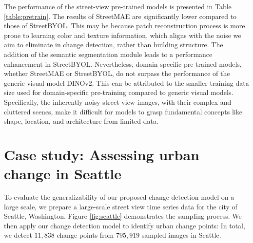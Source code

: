 \documentclass[letterpaper]{article} %
\begin{document}
The performance of the street-view pre-trained models is presented in Table \ref{table:pretrain}. The results of StreetMAE are significantly lower compared to those of StreetBYOL. This may be because patch reconstruction process is more prone to learning color and texture information, which aligns with the noise we aim to eliminate in change detection, rather than building structure. The addition of the semantic segmentation module leads to a performance enhancement in StreetBYOL. Nevertheless, domain-specific pre-trained models, whether StreetMAE or StreetBYOL, do not surpass the performance of the generic visual model DINOv2. This can be attributed to the smaller training data size used for domain-specific pre-training compared to generic visual models. Specifically, the inherently noisy street view images, with their complex and cluttered scenes, make it difficult for models to grasp fundamental concepts like shape, location, and architecture from limited data.

\section{Case study: Assessing urban change in Seattle}
To evaluate the generalizability of our proposed change detection model on a large scale, we prepare a large-scale street view time series data for the city of Seattle, Washington. Figure \ref{fig:seattle} demonstrates the sampling process. We then apply our change detection model to identify urban change points: In total, we detect $11,838$ change points from $795,919$ sampled images in Seattle. 
\end{document}
